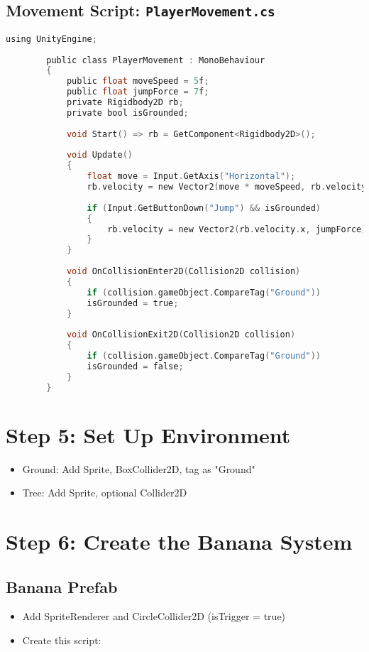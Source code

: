\documentclass[11pt]{article}
\begin{document}
	\subsection*{Movement Script: \texttt{PlayerMovement.cs}}
	\begin{lstlisting}[language=C]
		using UnityEngine;
		
		public class PlayerMovement : MonoBehaviour
		{
			public float moveSpeed = 5f;
			public float jumpForce = 7f;
			private Rigidbody2D rb;
			private bool isGrounded;
			
			void Start() => rb = GetComponent<Rigidbody2D>();
			
			void Update()
			{
				float move = Input.GetAxis("Horizontal");
				rb.velocity = new Vector2(move * moveSpeed, rb.velocity.y);
				
				if (Input.GetButtonDown("Jump") && isGrounded)
				{
					rb.velocity = new Vector2(rb.velocity.x, jumpForce);
				}
			}
			
			void OnCollisionEnter2D(Collision2D collision)
			{
				if (collision.gameObject.CompareTag("Ground"))
				isGrounded = true;
			}
			
			void OnCollisionExit2D(Collision2D collision)
			{
				if (collision.gameObject.CompareTag("Ground"))
				isGrounded = false;
			}
		}
	\end{lstlisting}
	
	\section*{Step 5: Set Up Environment}
	\begin{itemize}
		\item Ground: Add Sprite, BoxCollider2D, tag as "Ground"
		\item Tree: Add Sprite, optional Collider2D
	\end{itemize}
	
	\section*{Step 6: Create the Banana System}
	\subsection*{Banana Prefab}
	\begin{itemize}
		\item Add SpriteRenderer and CircleCollider2D (isTrigger = true)
		\item Create this script:
	\end{itemize}
	
\end{document}
